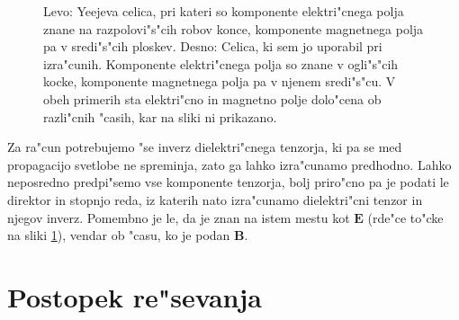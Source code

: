 \documentclass[12pt,twoside,openright,final]{report}
\renewcommand{\vec}{\mathbf}
\newcommand{\E}{\vec E}
\newcommand{\B}{\vec B}
\begin{document}
\begin{figure}[h]
\centering
\caption{Levo: Yeejeva celica, pri kateri so komponente elektri"cnega polja znane na razpolovi"s"cih robov konce, komponente magnetnega polja pa v sredi"s"cih ploskev\cite{yee-lattice}. Desno: Celica, ki sem jo uporabil pri izra"cunih. Komponente elektri"cnega polja so znane v ogli"s"cih kocke, komponente magnetnega polja pa v njenem sredi"s"cu. V obeh primerih sta elektri"cno in magnetno polje dolo"cena ob razli"cnih "casih, kar na sliki ni prikazano.}
\label{fig:lattice}
\end{figure}

Za ra"cun potrebujemo "se inverz dielektri"cnega tenzorja, ki pa se med propagacijo svetlobe ne spreminja, zato ga lahko izra"cunamo predhodno. 
Lahko neposredno predpi"semo vse komponente tenzorja, bolj priro"cno pa je podati le direktor in stopnjo reda, iz katerih nato izra"cunamo dielektri"cni tenzor in njegov inverz. 
Pomembno je le, da je znan na istem mestu kot $\E$ (rde"ce to"cke na sliki \ref{fig:lattice}), vendar ob "casu, ko je podan $\B$. 

\section{Postopek re"sevanja}
\end{document}
